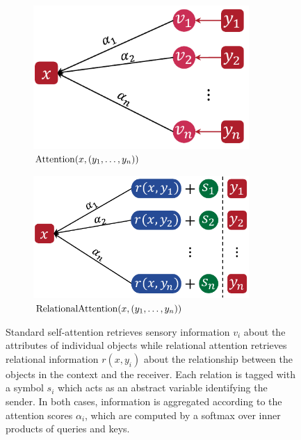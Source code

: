 \begin{figure}[t]
  \centering
  \begin{subfigure}[t]{0.415384615\textwidth} %
    \centering
    \includegraphics[width=0.9\textwidth]{figs/sensory_retrieval.pdf} %
    \caption{$\mathrm{Attention}(x, (y_1, \ldots, y_n))$}%
  \end{subfigure}
  \qquad
  \begin{subfigure}[t]{0.484615385\textwidth} %
    \centering
    \includegraphics[width=0.9\textwidth]{figs/relational_retrieval.pdf} %
    \caption{$\mathrm{RelationalAttention}(x, (y_1, \ldots, y_n))$}%
  \end{subfigure}
  \caption{Standard self-attention retrieves sensory information $v_i$ about the attributes of individual objects while relational attention retrieves relational information $r(x, y_i)$ about the relationship between the objects in the context and the receiver.
  Each relation is tagged with a symbol $s_i$ which acts as an abstract variable identifying the sender.
  In both cases, information is aggregated according to the attention scores $\alpha_i$, which are computed by a softmax over inner products of queries and keys.
  }\label{fig:selfattn_relattn}
  \vskip-12pt
\end{figure}

